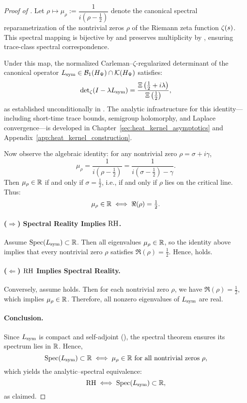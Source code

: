 \begin{proof}[Proof of ]
Let \( \rho \mapsto \mu_\rho := \dfrac{1}{i(\rho - \tfrac{1}{2})} \) denote the canonical spectral reparametrization of the nontrivial zeros \( \rho \) of the Riemann zeta function \( \zeta(s) \). This spectral mapping is bijective by  and preserves multiplicity by , ensuring trace-class spectral correspondence.

\medskip

Under this map, the normalized Carleman–\(\zeta\)-regularized determinant of the canonical operator \( L_{\mathrm{sym}} \in \mathcal{B}_1(H_{\Psi}) \cap \mathcal{K}(H_{\Psi}) \) satisfies:
\[
\det\nolimits_\zeta(I - \lambda L_{\mathrm{sym}}) = \frac{\Xi\left( \tfrac{1}{2} + i\lambda \right)}{\Xi\left( \tfrac{1}{2} \right)},
\]
as established unconditionally in . The analytic infrastructure for this identity—including short-time trace bounds, semigroup holomorphy, and Laplace convergence—is developed in Chapter~\ref{sec:heat_kernel_asymptotics} and Appendix~\ref{app:heat_kernel_construction}.

\medskip

Now observe the algebraic identity: for any nontrivial zero \( \rho = \sigma + i\gamma \),
\[
\mu_\rho = \frac{1}{i(\rho - \tfrac{1}{2})} = \frac{1}{i(\sigma - \tfrac{1}{2}) - \gamma}.
\]
Then \( \mu_\rho \in \mathbb{R} \) if and only if \( \sigma = \tfrac{1}{2} \), i.e., if and only if \( \rho \) lies on the critical line. Thus:
\[
\mu_\rho \in \mathbb{R} \iff \Re(\rho) = \tfrac{1}{2}.
\]

\paragraph*{(\( \Rightarrow \)) Spectral Reality Implies \(\mathrm{RH}\).}
Assume \( \operatorname{Spec}(L_{\mathrm{sym}}) \subset \mathbb{R} \). Then all eigenvalues \( \mu_\rho \in \mathbb{R} \), so the identity above implies that every nontrivial zero \( \rho \) satisfies \( \Re(\rho) = \tfrac{1}{2} \). Hence, \RH{} holds.

\paragraph*{(\( \Leftarrow \)) \(\mathrm{RH}\) Implies Spectral Reality.}
Conversely, assume \RH{} holds. Then for each nontrivial zero \( \rho \), we have \( \Re(\rho) = \tfrac{1}{2} \), which implies \( \mu_\rho \in \mathbb{R} \). Therefore, all nonzero eigenvalues of \( L_{\mathrm{sym}} \) are real.

\paragraph*{Conclusion.}
Since \( L_{\mathrm{sym}} \) is compact and self-adjoint (), the spectral theorem ensures its spectrum lies in \( \mathbb{R} \). Hence,
\[
\operatorname{Spec}(L_{\mathrm{sym}}) \subset \mathbb{R} \iff \mu_\rho \in \mathbb{R} \text{ for all nontrivial zeros } \rho,
\]
which yields the analytic–spectral equivalence:
\[
\mathrm{RH} \iff \operatorname{Spec}(L_{\mathrm{sym}}) \subset \mathbb{R},
\]
as claimed.
\end{proof}
